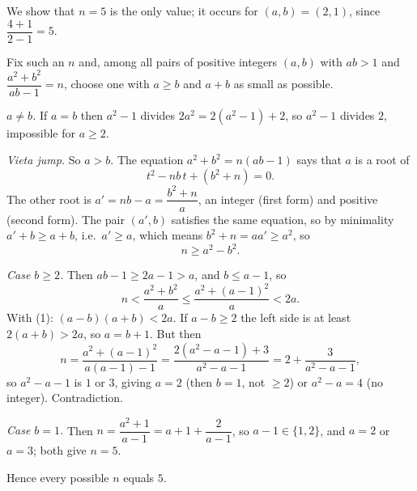 We show that $n=\boxed{5}$ is the only value; it occurs for $(a,b)=(2,1)$, since $\dfrac{4+1}{2-1}=5$.

Fix such an $n$ and, among all pairs of positive integers $(a,b)$ with $ab>1$ and $\dfrac{a^2+b^2}{ab-1}=n$, choose one with $a\ge b$ and $a+b$ as small as possible.

\emph{$a\ne b$.} If $a=b$ then $a^2-1$ divides $2a^2=2(a^2-1)+2$, so $a^2-1$ divides $2$, impossible for $a\ge2$.

\emph{Vieta jump.} So $a>b$. The equation $a^2+b^2=n(ab-1)$ says that $a$ is a root of
\[
t^2-nb\,t+(b^2+n)=0 .
\]
The other root is $a'=nb-a=\dfrac{b^2+n}{a}$, an integer (first form) and positive (second form). The pair $(a',b)$ satisfies the same equation, so by minimality $a'+b\ge a+b$, i.e.\ $a'\ge a$, which means $b^2+n=aa'\ge a^2$, so
\[
n\ge a^2-b^2. \tag{1}
\]

\emph{Case $b\ge2$.} Then $ab-1\ge2a-1>a$, and $b\le a-1$, so
\[
n<\dfrac{a^2+b^2}{a}\le\dfrac{a^2+(a-1)^2}{a}<2a .
\]
With (1): $(a-b)(a+b)<2a$. If $a-b\ge2$ the left side is at least $2(a+b)>2a$, so $a=b+1$. But then
\[
n=\dfrac{a^2+(a-1)^2}{a(a-1)-1}=\dfrac{2(a^2-a-1)+3}{a^2-a-1}=2+\dfrac{3}{a^2-a-1},
\]
so $a^2-a-1$ is $1$ or $3$, giving $a=2$ (then $b=1$, not $\ge2$) or $a^2-a=4$ (no integer). Contradiction.

\emph{Case $b=1$.} Then $n=\dfrac{a^2+1}{a-1}=a+1+\dfrac{2}{a-1}$, so $a-1\in\{1,2\}$, and $a=2$ or $a=3$; both give $n=5$.

Hence every possible $n$ equals $5$.
